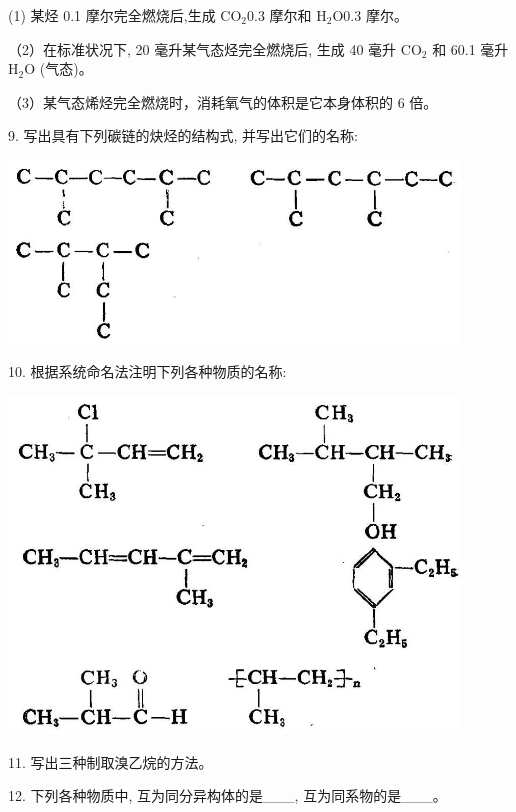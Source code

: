 \documentclass[10pt]{article}
\begin{document}
(1) 某烃 0.1 摩尔完全燃烧后,生成 \({\mathrm{{CO}}}_{2}{0.3}\) 摩尔和 \({\mathrm{H}}_{2}\mathrm{O}{0.3}\) 摩尔。

（2）在标准状况下, 20 毫升某气态烃完全燃烧后, 生成 40 毫升 \({\mathrm{{CO}}}_{2}\) 和 60.1 毫升 \({\mathrm{H}}_{2}\mathrm{O}\) (气态)。

（3）某气态烯烃完全燃烧时，消耗氧气的体积是它本身体积的 6 倍。

9. 写出具有下列碳链的炔烃的结构式, 并写出它们的名称:

\begin{center}
\includegraphics[max width=0.9\textwidth]{images/01912d16-be99-77bb-9535-4f3ed8d9946f_205_777004.jpg}
\end{center}

10. 根据系统命名法注明下列各种物质的名称:

\begin{center}
\includegraphics[max width=0.9\textwidth]{images/01912d16-be99-77bb-9535-4f3ed8d9946f_205_908478.jpg}
\end{center}

11. 写出三种制取溴乙烷的方法。

12. 下列各种物质中, 互为同分异构体的是\_\_\_, 互为同系物的是\_\_\_。
\end{document}
